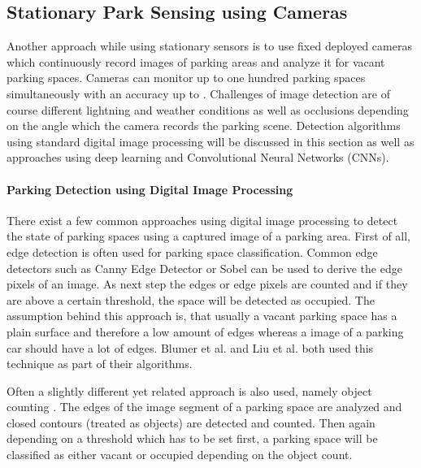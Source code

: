 




\subsection{Stationary Park Sensing using Cameras}
\label{sec:stationary_park_sensing_cameras}

Another approach while using stationary sensors is to use fixed deployed cameras which continuously record images of parking areas and analyze it for vacant parking spaces. Cameras can monitor up to one hundred parking spaces simultaneously with an accuracy up to . Challenges of image detection are of course different lightning and weather conditions as well as occlusions depending on the angle which the camera records the parking scene. Detection algorithms using standard digital image processing will be discussed in this section as well as approaches using deep learning and Convolutional Neural Networks (CNNs).

\paragraph{Parking Detection using Digital Image Processing}

There exist a few common approaches using digital image processing to detect the state of parking spaces using a captured image of a parking area. First of all, edge detection is often used for parking space classification. Common edge detectors such as Canny Edge Detector or Sobel can be used to derive the edge pixels of an image. As next step the edges or edge pixels are counted and if they are above a certain threshold, the space will be detected as occupied. The assumption behind this approach is, that usually a vacant parking space has a plain surface and therefore a low amount of edges whereas a image of a parking car should have a lot of edges. Blumer et al. \cite{Blumer2012} and Liu et al. \cite{stationary_camera_sensing} both used this technique as part of their algorithms. 

Often a slightly different yet related approach is also used, namely object counting \cite{stationary_camera_sensing}. The edges of the image segment of a parking space are analyzed and closed contours (treated as objects) are detected and counted. Then again depending on a threshold which has to be set first, a parking space will be classified as either vacant or occupied depending on the object count.

